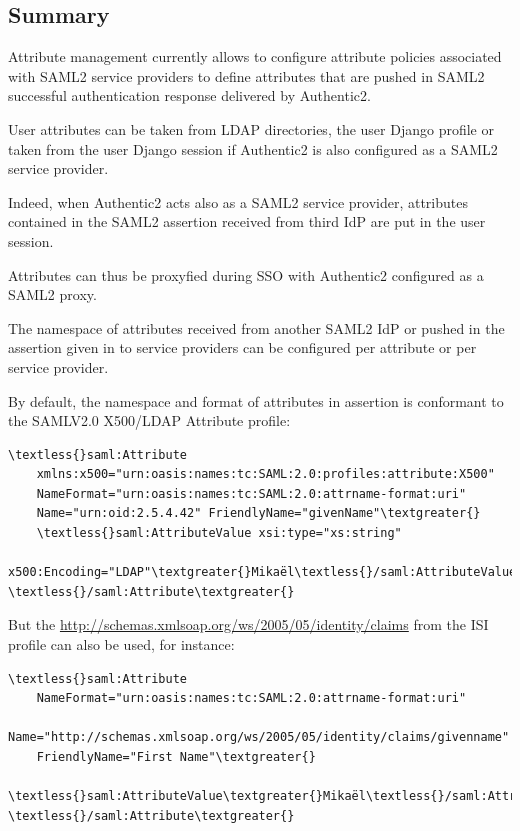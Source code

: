 \documentclass[letterpaper,10pt,english]{sphinxmanual}
\begin{document}
\subsection{Summary}
\label{attribute_management:summary}
Attribute management currently allows to configure attribute policies
associated with SAML2 service providers to define attributes that are
pushed in SAML2 successful authentication response delivered by Authentic2.

User attributes can be taken from LDAP directories, the user Django
profile or taken from the user Django session if Authentic2 is also configured
as a SAML2 service provider.

Indeed, when Authentic2 acts also as a SAML2 service provider,
attributes contained in the SAML2 assertion received from third IdP are put in
the user session.

Attributes can thus be proxyfied during SSO with Authentic2
configured as a SAML2 proxy.

The namespace of attributes received from another SAML2 IdP or pushed in the
assertion given in to service providers can be configured per attribute or per
service provider.

By default, the namespace and format of attributes in assertion is conformant
to the SAMLV2.0 X500/LDAP Attribute profile:

\begin{Verbatim}[commandchars=\\\{\}]
\textless{}saml:Attribute
    xmlns:x500="urn:oasis:names:tc:SAML:2.0:profiles:attribute:X500"
    NameFormat="urn:oasis:names:tc:SAML:2.0:attrname-format:uri"
    Name="urn:oid:2.5.4.42" FriendlyName="givenName"\textgreater{}
    \textless{}saml:AttributeValue xsi:type="xs:string"
        x500:Encoding="LDAP"\textgreater{}Mikaël\textless{}/saml:AttributeValue\textgreater{}
\textless{}/saml:Attribute\textgreater{}
\end{Verbatim}

But the \href{http://schemas.xmlsoap.org/ws/2005/05/identity/claims}{http://schemas.xmlsoap.org/ws/2005/05/identity/claims} from the ISI
profile can also be used, for instance:

\begin{Verbatim}[commandchars=\\\{\}]
\textless{}saml:Attribute
    NameFormat="urn:oasis:names:tc:SAML:2.0:attrname-format:uri"
    Name="http://schemas.xmlsoap.org/ws/2005/05/identity/claims/givenname"
    FriendlyName="First Name"\textgreater{}
    \textless{}saml:AttributeValue\textgreater{}Mikaël\textless{}/saml:AttributeValue\textgreater{}
\textless{}/saml:Attribute\textgreater{}
\end{Verbatim}
\end{document}
